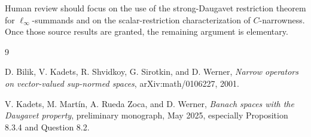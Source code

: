 \documentclass[11pt]{article}
\begin{document}
Human review should focus on the use of the strong-Daugavet restriction
theorem for \(\ell_\infty\)-summands and on the scalar-restriction
characterization of \(C\)-narrowness.  Once those source results are granted,
the remaining argument is elementary.

\begin{thebibliography}{9}

D. Bilik, V. Kadets, R. Shvidkoy, G. Sirotkin, and D. Werner,
\emph{Narrow operators on vector-valued sup-normed spaces},
arXiv:math/0106227, 2001.

V. Kadets, M. Mart\'in, A. Rueda Zoca, and D. Werner,
\emph{Banach spaces with the Daugavet property}, preliminary monograph,
May 2025, especially Proposition 8.3.4 and Question 8.2.

\end{thebibliography}
\end{document}
